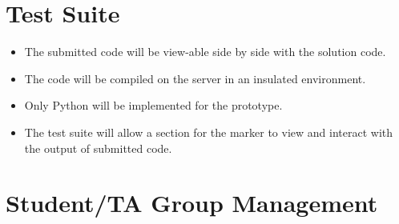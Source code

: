 \documentclass{article}
\begin{document}
\section{Test Suite}
\begin{itemize}
  \item The submitted code will be view-able side by side with the solution code.
  \item The code will be compiled on the server in an insulated environment.
  \item Only Python will be implemented for the prototype.
  \item The test suite will allow a section for the marker to view and interact
    with the output of submitted code.
\end{itemize}

\section{Student/TA Group Management}
\end{document}
